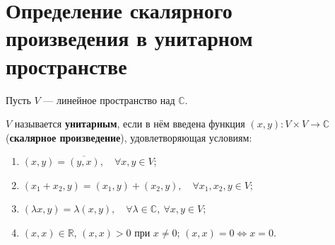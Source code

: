 \section{Определение скалярного произведения в унитарном пространстве}

\begin{definition}
Пусть $V$ --- линейное пространство над $\mathbb{C}$.

$V$ называется \textbf{унитарным}, если в нём введена функция $(x, y): V \times V \to \mathbb{C}$ (\textbf{скалярное произведение}), удовлетворяющая условиям:
\begin{enumerate}
    \item $(x, y) = \overline{(y, x)},\quad \forall x, y \in V$;
    \item $(x_1 + x_2, y) = (x_1, y) + (x_2, y),\quad \forall x_1, x_2, y \in V$;
    \item $(\lambda x, y) = \lambda (x, y),\quad \forall \lambda \in \mathbb{C},\ \forall x, y \in V$;
    \item $(x, x) \in \mathbb{R}$, $(x, x) > 0$ при $x \neq 0$; $(x, x) = 0 \iff x = 0$.
\end{enumerate}
\end{definition}
